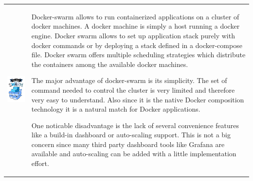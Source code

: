\begin{table}[h!]
  \centering
  \begin{tabular}{ c m{9cm} }
    \begin{minipage}{.3\textwidth}
      \includegraphics[width=\linewidth]{images/dependencies/docker-swarm}
    \end{minipage}&
    Docker-swarm allows to run containerized applications on a cluster of docker
    machines. A docker machine is simply a host running a docker engine. Docker
    swarm allows to set up application stack purely with docker commands or by
    deploying a stack defined in a docker-compose file. Docker swarm offers
    multiple scheduling strategies which distribute the containers among the
    available docker machines.
    
    The major advantage of docker-swarm is its simplicity. The set of command
    needed to control the cluster is very limited and therefore very easy to
    understand. Also since it is the native Docker composition technology it is
    a natural match for Docker applications.
    
    One noticable disadvantage is the lack of several convenience features like
    a build-in dashboard or auto-scaling support. This is not a big concern
    since many third party dashboard tools like Grafana are available and
    auto-scaling can be added with a little implementation effort. 
  \end{tabular}
\end{table}
\FloatBarrier

